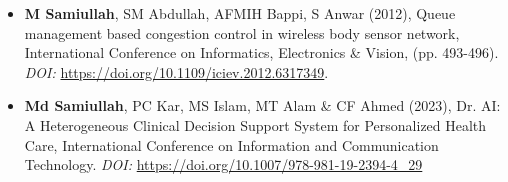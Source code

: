 \begin{itemize}[noitemsep]
    \item {\bf M Samiullah}, SM Abdullah, AFMIH Bappi, S Anwar (2012), Queue management based congestion control in wireless body sensor network, International Conference on Informatics, Electronics \& Vision, (pp. 493-496). {\em DOI:} \url{https://doi.org/10.1109/iciev.2012.6317349}.
    \item {\bf Md Samiullah}, PC Kar, MS Islam, MT Alam \& CF Ahmed (2023), Dr. AI: A Heterogeneous Clinical Decision Support System for Personalized Health Care, International Conference on Information and Communication Technology. {\em DOI:} \url{https://doi.org/10.1007/978-981-19-2394-4_29}
\end{itemize}